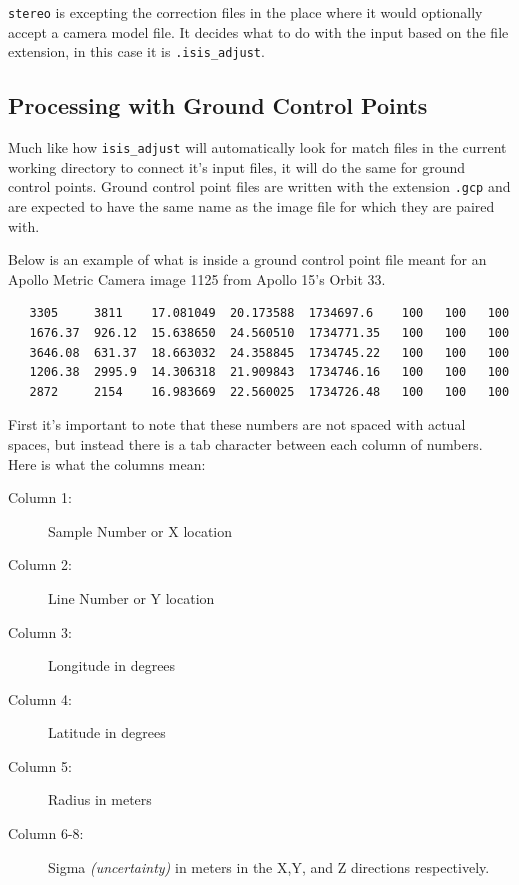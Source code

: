 \texttt{stereo} is excepting the correction files in the place where
it would optionally accept a camera model file. It decides what to do
with the input based on the file extension, in this case it is
\verb=.isis_adjust=.

\subsection{Processing with Ground Control Points}

Much like how \texttt{isis\_adjust} will automatically look for match
files in the current working directory to connect it's input files, it
will do the same for ground control points. Ground control point files
are written with the extension \verb=.gcp= and are expected to have
the same name as the image file for which they are paired with.

Below is an example of what is inside a ground control point file
meant for an Apollo Metric Camera image 1125 from Apollo 15's Orbit
33.

\begin{verbatim}
   3305     3811    17.081049  20.173588  1734697.6    100   100   100
   1676.37  926.12  15.638650  24.560510  1734771.35   100   100   100
   3646.08  631.37  18.663032  24.358845  1734745.22   100   100   100
   1206.38  2995.9  14.306318  21.909843  1734746.16   100   100   100
   2872     2154    16.983669  22.560025  1734726.48   100   100   100
\end{verbatim}

First it's important to note that these numbers are not spaced with
actual spaces, but instead there is a tab character between each
column of numbers. Here is what the columns mean:

\begin{myindentpar}{2cm}
\begin{description}
  \item[Column 1:] Sample Number or X location
  \item[Column 2:] Line Number or Y location
  \item[Column 3:] Longitude in degrees
  \item[Column 4:] Latitude in degrees
  \item[Column 5:] Radius in meters
  \item[Column 6-8:] Sigma \emph{(uncertainty)} in meters in the X,Y,
    and Z directions respectively.
\end{description}
\end{myindentpar}

